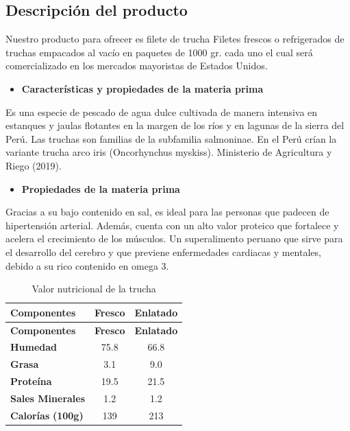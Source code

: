 \documentclass[
  stu,
  floatsintext,
  longtable,
  a4paper,
  nolmodern,
  notxfonts,
  notimes,
  12pt,
  colorlinks=true,linkcolor=blue,citecolor=blue,urlcolor=blue]{apa7}
\providecommand{\tightlist}{%
  \setlength{\itemsep}{0pt}\setlength{\parskip}{0pt}}
\begin{document}
\subsection{Descripción del producto}\label{descripciuxf3n-del-producto}

Nuestro producto para ofrecer es filete de trucha Filetes frescos o
refrigerados de truchas empacados al vacío en paquetes de 1000 gr. cada
uno el cual será comercializado en los mercados mayoristas de Estados
Unidos.

\begin{itemize}
\tightlist
\item
  \textbf{Características y propiedades de la materia prima}
\end{itemize}

Es una especie de pescado de agua dulce cultivada de manera intensiva en
estanques y jaulas flotantes en la margen de los ríos y en lagunas de la
sierra del Perú. Las truchas son familias de la subfamilia salmoninae.
En el Perú crían la variante trucha arco iris (Oncorhynchus myskiss).
Ministerio de Agricultura y Riego (2019).

\begin{itemize}
\tightlist
\item
  \textbf{Propiedades de la materia prima}
\end{itemize}

Gracias a su bajo contenido en sal, es ideal para las personas que
padecen de hipertensión arterial. Además, cuenta con un alto valor
proteico que fortalece y acelera el crecimiento de los músculos. Un
superalimento peruano que sirve para el desarrollo del cerebro y que
previene enfermedades cardiacas y mentales, debido a su rico contenido
en omega 3.

\begin{longtable}[]{@{}lcc@{}}
\caption{Valor nutricional de la trucha}\tabularnewline
\toprule\noalign{}
\textbf{Componentes} & \textbf{Fresco} & \textbf{Enlatado} \\
\midrule\noalign{}
\endfirsthead
\toprule\noalign{}
\textbf{Componentes} & \textbf{Fresco} & \textbf{Enlatado} \\
\midrule\noalign{}
\endhead
\bottomrule\noalign{}
\endlastfoot
\textbf{Humedad} & 75.8 & 66.8 \\
\textbf{Grasa} & 3.1 & 9.0 \\
\textbf{Proteína} & 19.5 & 21.5 \\
\textbf{Sales Minerales} & 1.2 & 1.2 \\
\textbf{Calorías} \textbf{(100g)} & 139 & 213 \\
\end{longtable}
\end{document}
